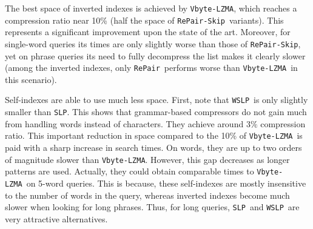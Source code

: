\documentclass[review]{elsarticle}
\newcommand{\repair}{Re-Pair}
\newcommand{\simplen}{\texttt{Simple9}}
\newcommand{\vbyteCM}{\texttt{Vbyte-CM}}
\newcommand{\vbyteST}{\texttt{Vbyte-ST}}
\newcommand{\repairNo}{\texttt{RePair}}
\newcommand{\repairSkip}{\texttt{RePair-Skip}}
\newcommand{\vbyteLZMA}{\texttt{Vbyte-LZMA}}
\newcommand{\rlcsa}{\texttt{RLCSA}}
\newcommand{\wcsa}{\texttt{WCSA}}
\newcommand{\slp}{\texttt{SLP}}
\newcommand{\wslp}{\texttt{WSLP}}
\newcommand{\lzindex}{\texttt{LZ77-index}}
\newcommand{\lzendindex}{\texttt{LZend-index}}
\begin{document}
%
The best space of inverted indexes is achieved by \vbyteLZMA, which reaches
a compression ratio near 10\% (half the space of \repairSkip\ variants). This represents a significant improvement upon the state of the art. Moreover, for single-word queries its times are
only slightly worse than those of \repairSkip, yet on phrase queries its need
to fully decompress the list makes it clearly slower (among the inverted indexes, only \repairNo\ performs worse than \vbyteLZMA\ in this scenario).

Self-indexes are able to use much less space. First, note that \wslp\ is only 
slightly smaller than \slp. This shows that grammar-based compressors do not gain
much from handling words instead of characters. They achieve around $3\%$
compression ratio. This important reduction in space compared to the 10\% of
\vbyteLZMA\ is paid with
a sharp increase in search times. On words, they are up to two orders of magnitude slower 
than \vbyteLZMA. However, this gap decreases as longer patterns are used. Actually, they could obtain comparable times to \vbyteLZMA\ on 5-word queries. This is because, these self-indexes are mostly 
insensitive to the number of words in the query, whereas inverted indexes become 
much slower when looking for long phrases. Thus, for long queries, 
\slp\ and \wslp\ are very attractive alternatives.

%
\end{document}

